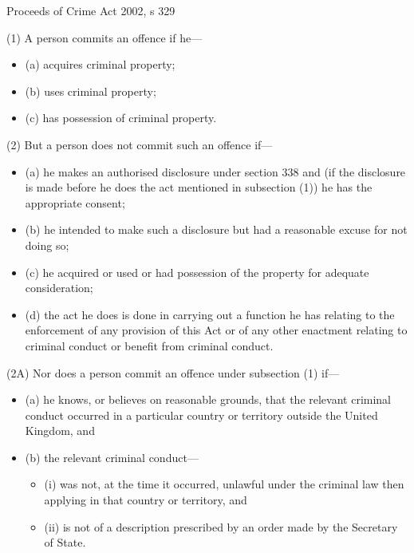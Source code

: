 \documentclass[
]{article}
\newenvironment{env-28b706cc-8a08-422f-af86-ede86c79505b}
{
    \savenotes\tcolorbox[blanker,breakable,left=5pt,borderline west={2pt}{-4pt}{green}]
}
{
    \endtcolorbox\spewnotes
}
\begin{document}
\begin{env-28b706cc-8a08-422f-af86-ede86c79505b}

Proceeds of Crime Act 2002, s 329

(1) A person commits an offence if he---

\begin{itemize}
\item
  (a) acquires criminal property;
\item
  (b) uses criminal property;
\item
  (c) has possession of criminal property.
\end{itemize}

(2) But a person does not commit such an offence if---

\begin{itemize}
\item
  (a) he makes an authorised disclosure under section 338 and (if the
  disclosure is made before he does the act mentioned in subsection (1))
  he has the appropriate consent;
\item
  (b) he intended to make such a disclosure but had a reasonable excuse
  for not doing so;
\item
  (c) he acquired or used or had possession of the property for adequate
  consideration;
\item
  (d) the act he does is done in carrying out a function he has relating
  to the enforcement of any provision of this Act or of any other
  enactment relating to criminal conduct or benefit from criminal
  conduct.
\end{itemize}

(2A) Nor does a person commit an offence under subsection (1) if---

\begin{itemize}
\item
  (a) he knows, or believes on reasonable grounds, that the relevant
  criminal conduct occurred in a particular country or territory outside
  the United Kingdom, and
\item
  (b) the relevant criminal conduct---

  \begin{itemize}
  \item
    (i) was not, at the time it occurred, unlawful under the criminal
    law then applying in that country or territory, and
  \item
    (ii) is not of a description prescribed by an order made by the
    Secretary of State.
  \end{itemize}
\end{itemize}


\end{env-28b706cc-8a08-422f-af86-ede86c79505b}
\end{document}
